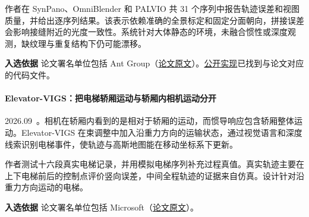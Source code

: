作者在 SynPano、OmniBlender 和 PALVIO 共 31 个序列中报告轨迹误差和视图质量，并给出逐序列结果。该表示依赖准确的全景标定和固定分面朝向，拼接误差会影响接缝附近的光度一致性。系统针对大体静态的环境，未融合惯性或深度观测，缺纹理与重复结构下仍可能漂移。

\textbf{入选依据} 论文署名单位包括 Ant Group（\href{https://arxiv.org/abs/2609.21347}{论文原文}）。\href{https://github.com/guoxf304/cubesplat}{公开实现}已找到与论文对应的代码文件。

\paragraph{Elevator-VIGS：把电梯轿厢运动与轿厢内相机运动分开}
2026.09~\cite{2609_23491}。相机在轿厢内看到的是相对于轿厢的运动，而惯导响应包含轿厢整体运动。Elevator-VIGS 在束调整中加入沿重力方向的运输状态，通过视觉语言和深度线索识别电梯事件，使轨迹与高斯地图能在移动坐标系下更新。

作者测试十六段真实电梯记录，并用模拟电梯序列补充过程真值。真实轨迹主要在上下电梯前后的控制点评价竖向误差，中间全程轨迹的证据来自仿真。设计针对沿重力方向运动的电梯。

\textbf{入选依据} 论文署名单位包括 Microsoft（\href{https://arxiv.org/abs/2609.23491}{论文原文}）。
